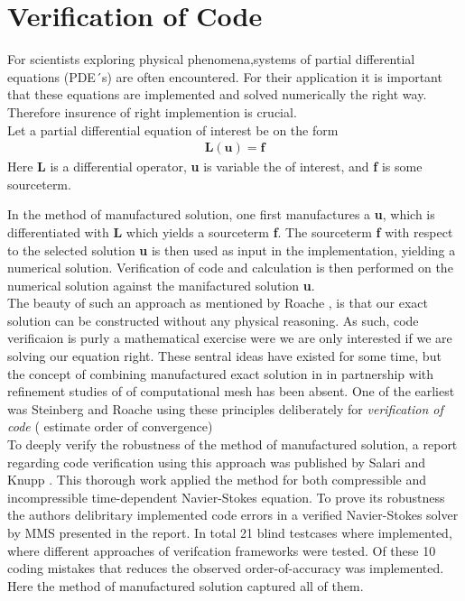 \section{Verification of Code}
For scientists exploring physical phenomena,systems of partial differential equations (PDE´s) are often encountered. For their application it is important that these equations are implemented and solved numerically the right way.  Therefore insurence of right implemention is crucial. \\

Let a  partial differential equation of interest be on the form
\begin{align*}
\textbf{L}(\textbf{u}) = \textbf{f}
\end{align*}
\newpage
Here \textbf{L} is a differential operator, \textbf{u} is variable the of interest, and \textbf{f} is some sourceterm.

In the method of manufactured solution, one first manufactures a \textbf{u}, which is differentiated with \textbf{L} which yields a sourceterm  \textbf{f}. The sourceterm \textbf{f} with respect to the selected solution \textbf{u} is then used as input in the implementation, yielding a numerical solution. Verification of code and calculation is then performed on the numerical solution against the manifactured solution \textbf{u}.  \\ 

The beauty of such an approach as mentioned by Roache \cite{Roache2002}, is that our exact solution can be constructed without any physical reasoning. As such, code verificaion is purly a mathematical exercise were we are only interested if we are solving our equation right. These sentral ideas have existed for some time, but the  concept of combining manufactured exact solution in in partnership with refinement studies of of computational mesh has been absent.  One of the earliest was Steinberg and Roache \cite{Steinberg1985} using these principles deliberately for \textit{verification of code} ( estimate order of convergence)\\

To deeply verify the robustness of the method of manufactured solution,  a report regarding code verification using this approach was published by Salari and Knupp \cite{Biggs}. This thorough work applied the method for both compressible and incompressible time-dependent Navier-Stokes equation. To prove its robustness the authors  delibritary implemented  code errors in a verified Navier-Stokes solver by MMS presented in the report. In total 21 blind testcases where implemented, where different approaches of verifcation frameworks were tested. 
Of these 10 coding mistakes that reduces the observed order-of-accuracy was implemented. Here the method of manufactured solution captured all of them. \\


